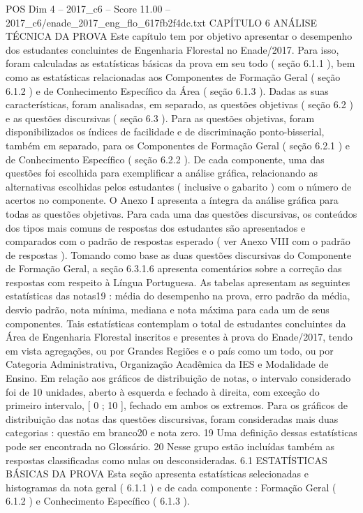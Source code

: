 \begin{textsample}{POS Dim 4 – 2017\_c6 – Score 11.00 – 2017\_c6/enade\_2017\_eng\_flo\_617fb2f4dc.txt}  \label{ex:f4_pos_032}
CAPÍTULO 6 ANÁLISE TÉCNICA DA PROVA Este capítulo tem por objetivo apresentar o desempenho dos estudantes concluintes de Engenharia Florestal no Enade/2017.
Para isso, foram calculadas as estatísticas básicas da prova em seu todo ( seção 6.1.1 ), bem como as estatísticas relacionadas aos Componentes de Formação Geral ( seção 6.1.2 ) e de Conhecimento Específico da Área ( seção 6.1.3 ).
Dadas as suas características, foram analisadas, em separado, as questões objetivas ( seção 6.2 ) e as questões discursivas ( seção 6.3 ).
Para as questões objetivas, foram disponibilizados os índices de facilidade e de discriminação ponto-bisserial, também em separado, para os Componentes de Formação Geral ( seção 6.2.1 ) e de Conhecimento Específico ( seção 6.2.2 ).
De cada componente, uma das questões foi escolhida para exemplificar a análise gráfica, relacionando as alternativas escolhidas pelos estudantes ( inclusive o gabarito ) com o número de acertos no componente.
O Anexo I apresenta a íntegra da análise gráfica para todas as questões objetivas.
Para cada uma das questões discursivas, os conteúdos dos tipos mais comuns de respostas dos estudantes são apresentados e comparados com o padrão de respostas esperado ( ver Anexo VIII com o padrão de respostas ).
Tomando como base as duas questões discursivas do Componente de Formação Geral, a seção 6.3.1.6 apresenta comentários sobre a correção das respostas com respeito à Língua Portuguesa.
As tabelas apresentam as seguintes estatísticas das notas19 : média do desempenho na prova, erro padrão da média, desvio padrão, nota mínima, mediana e nota máxima para cada um de seus componentes.
Tais estatísticas contemplam o total de estudantes concluintes da Área de Engenharia Florestal inscritos e presentes à prova do Enade/2017, tendo em vista agregações, ou por Grandes Regiões e o país como um todo, ou por Categoria Administrativa, Organização Acadêmica da IES e Modalidade de Ensino.
Em relação aos gráficos de distribuição de notas, o intervalo considerado foi de 10 unidades, aberto à esquerda e fechado à direita, com exceção do primeiro intervalo, [ 0 ; 10 ], fechado em ambos os extremos.
Para os gráficos de distribuição das notas das questões discursivas, foram consideradas mais duas categorias : questão em branco20 e nota zero. 19 Uma definição dessas estatísticas pode ser encontrada no Glossário. 20 Nesse grupo estão incluídas também as respostas classificadas como nulas ou desconsideradas. 6.1 ESTATÍSTICAS BÁSICAS DA PROVA Esta seção apresenta estatísticas selecionadas e histogramas da nota geral ( 6.1.1 ) e de cada componente : Formação Geral ( 6.1.2 ) e Conhecimento Específico ( 6.1.3 ).

\end{textsample}
